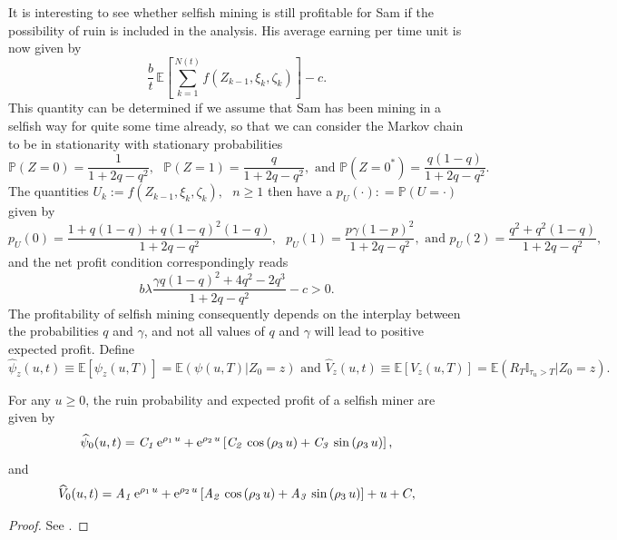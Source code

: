 \noindent It is interesting to see whether selfish mining is still profitable for Sam if the possibility of ruin is included in the analysis. His average earning per time unit is now given by 
\begin{equation}\label{eq:average_earning_selfish}
\frac{b}{t}\,\mathbb{E}\left[\sum_{k = 1}^{N(t)}f(Z_{k-1},\xi_k,\zeta_k)\right] - c.
\end{equation}
This quantity can be determined if we assume that Sam has been mining in a selfish way for quite some time already, so that we can consider the Markov chain to be in stationarity with stationary probabilities
$$
\mathbb{P}(Z = 0)=\frac{1}{1+2q-q^2},\text{ }\mathbb{P}(Z = 1)=\frac{q}{1+2q-q^2},\text{ and }\mathbb{P}(Z = 0^{\ast})=\frac{q(1-q)}{1+2q-q^2}.
$$
The quantities $U_k:=f\left(Z_{k-1},\xi_k,\zeta_k\right),\text{ }n\geq1$ then have a \pmf $p_U(\cdot): =\mathbb{P}(U = \cdot)$ given by 
$$
p_U(0) =\frac{1+q(1-q)+q(1-q)^2(1-q)}{1+2q-q^2},\text{ }p_U(1)=\frac{p\gamma(1-p)^2}{1+2q-q^2},\text{ and }p_U(2)=\frac{q^2+q^2(1-q)}{1+2q-q^2},
$$
and the net profit condition correspondingly reads
\begin{equation*}
b\lambda\frac{\gamma q(1-q)^2 + 4q^2-2q^3}{1+2q-q^2} - c>0.
\end{equation*}
The profitability of selfish mining consequently depends on the interplay between the probabilities $q$ and $\gamma$, and not all values of $q$ and $\gamma$ will lead to positive expected profit. Define 
\begin{equation*}
\widehat{\psi}_z(u,t)\equiv \mathbb{E}\left[\psi_z(u,T)\right] = \mathbb{E}\left(\psi(u,T)\Big \rvert Z_0 = z\right)
\text{ and }\widehat{V}_z(u,t)\equiv \mathbb{E}[V_z(u,T)] = \mathbb{E}\left(R_T\mathbb{I}_{\tau_u>T}\Big \rvert Z_0 = z\right).
\end{equation*}
\begin{theo}\label{theo:psi_V_selfish}
For any $u\ge 0$, the ruin probability and expected profit of a selfish miner are given by
\begin{equation*}\label{ruin_selfish_app}
\widehat{\psi}_0(u,t) =
{\it C_1}\,{{\rm e}^{\rho_1\,u}}+{{\rm e}^{\rho_2\,u}} \left[ {\it C_2}\,
\cos \left( \rho_3\,u \right) +{\it C_3}\,\sin \left( \rho_3\,u \right)\right],
\end{equation*}
and 
\begin{equation*}
\widehat{V}_0(u,t)={\it A_1}\,{{\rm e}^{\rho_1\,u}}+{{\rm e}^{\rho_2\,u}} \left[ {\it A_2}\,
\cos \left( \rho_3\,u \right) +{\it A_3}\,\sin \left( \rho_3\,u \right)\right] +u+C,\label{thisone}
\end{equation*}
\end{theo}
\begin{proof}
See \citet{albrecher:hal-02649025}.
\end{proof}

